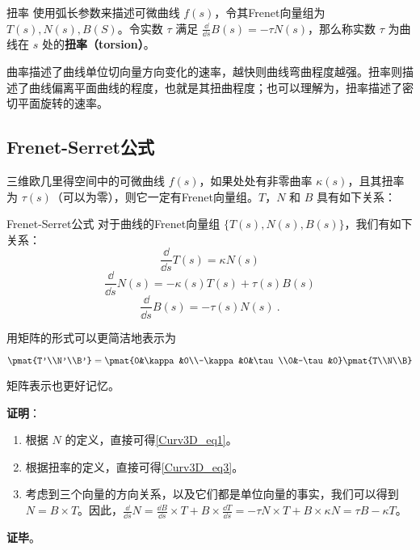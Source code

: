 \begin{definition}{扭率}
使用弧长参数来描述可微曲线 $f(s)$，令其Frenet向量组为 $T(s), N(s), B(S)$。令实数 $\tau$ 满足 $\frac{\dd}{\dd s}B(s)=-\tau N(s)$，那么称实数 $\tau$ 为曲线在 $s$ 处的\textbf{扭率（torsion）}。
\end{definition}

曲率描述了曲线单位切向量方向变化的速率，越快则曲线弯曲程度越强。扭率则描述了曲线偏离平面曲线的程度，也就是其扭曲程度；也可以理解为，扭率描述了密切平面旋转的速率。

\subsection{Frenet-Serret公式}

三维欧几里得空间中的可微曲线 $f(s)$，如果处处有非零曲率 $\kappa(s)$，且其扭率为 $\tau(s)$（可以为零），则它一定有Frenet向量组。$T$，$N$ 和 $B$ 具有如下关系：

\begin{theorem}{Frenet-Serret公式}
对于曲线的Frenet向量组 $\{T(s), N(s), B(s)\}$，我们有如下关系：
\begin{equation}\label{Curv3D_eq1}
\frac{\dd}{\dd s}T(s)=\kappa N(s)
\end{equation}
\begin{equation}\label{Curv3D_eq2}
\frac{\dd}{\dd s}N(s)=-\kappa(s) T(s)+\tau(s) B(s)
\end{equation}
\begin{equation}\label{Curv3D_eq3}
\frac{\dd}{\dd s}B(s)=-\tau(s) N(s)~.
\end{equation}

用矩阵的形式可以更简洁地表示为

\begin{equation}
\pmat{T'\\N'\\B'}=\pmat{0&\kappa&0\\-\kappa&0&\tau\\0&-\tau&0}\pmat{T\\N\\B}
\end{equation}

矩阵表示也更好记忆。
\end{theorem}

\textbf{证明}：

\begin{enumerate}
\item 根据 $N$ 的定义，直接可得\autoref{Curv3D_eq1}。
\item 根据扭率的定义，直接可得\autoref{Curv3D_eq3}。
\item 考虑到三个向量的方向关系，以及它们都是单位向量的事实，我们可以得到 $N=B\times T$。因此，$\frac{\dd}{\dd s}N=\frac{\dd B}{\dd s}\times T+B\times\frac{\dd T}{\dd s}=-\tau N\times T+B\times\kappa N=\tau B-\kappa T$。
\end{enumerate}

\textbf{证毕}。





